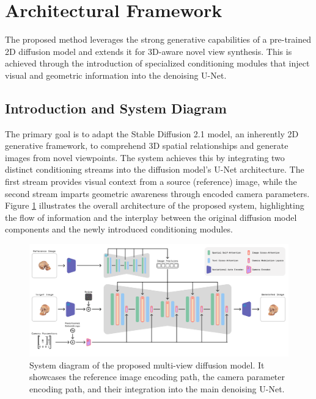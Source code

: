 \section{Architectural Framework}\label{sec:architectural-framework}
The proposed method leverages the strong generative capabilities of a pre-trained 2D diffusion model and extends it for 3D-aware novel view synthesis. This is achieved through the introduction of specialized conditioning modules that inject visual and geometric information into the denoising U-Net.

\subsection{Introduction and System Diagram}
The primary goal is to adapt the Stable Diffusion 2.1 model, an inherently 2D generative framework, to comprehend 3D spatial relationships and generate images from novel viewpoints. The system achieves this by integrating two distinct conditioning streams into the diffusion model's U-Net architecture. The first stream provides visual context from a source (reference) image, while the second stream imparts geometric awareness through encoded camera parameters.
Figure \ref{fig:my-method-diagram} illustrates the overall architecture of the proposed system, highlighting the flow of information and the interplay between the original diffusion model components and the newly introduced conditioning modules.

\begin{figure}[htbp]
  \centering
  \includegraphics[width=\textwidth]{images/proposed-method/my-method-diagram.png}
  \caption{System diagram of the proposed multi-view diffusion model. It showcases the reference image encoding path, the camera parameter encoding path, and their integration into the main denoising U-Net.}
  \label{fig:my-method-diagram}
\end{figure}

